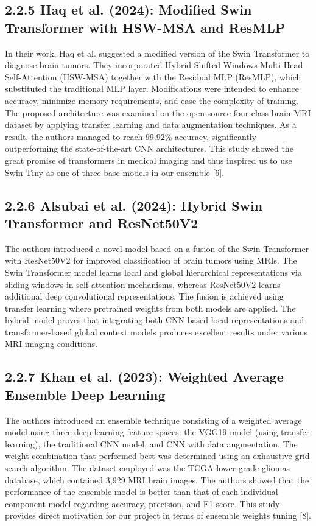 \documentclass[12pt,a4paper,oneside]{report}
\begin{document}
\subsection*{2.2.5 Haq et al. (2024): Modified Swin Transformer with HSW-MSA and ResMLP}
In their work, Haq et al. suggested a modified version of the Swin Transformer to diagnose brain tumors. They incorporated Hybrid Shifted Windows Multi-Head Self-Attention (HSW-MSA) together with the Residual MLP (ResMLP), which substituted the traditional MLP layer. Modifications were intended to enhance accuracy, minimize memory requirements, and ease the complexity of training. The proposed architecture was examined on the open-source four-class brain MRI dataset by applying transfer learning and data augmentation techniques. As a result, the authors managed to reach 99.92\% accuracy, significantly outperforming the state-of-the-art CNN architectures. This study showed the great promise of transformers in medical imaging and thus inspired us to use Swin-Tiny as one of three base models in our ensemble [6].
\subsection*{2.2.6 Alsubai et al. (2024): Hybrid Swin Transformer and ResNet50V2}
The authors introduced a novel model based on a fusion of the Swin Transformer with ResNet50V2 for improved classification of brain tumors using MRIs. The Swin Transformer model learns local and global hierarchical representations via sliding windows in self-attention mechanisms, whereas ResNet50V2 learns additional deep convolutional representations. The fusion is achieved using transfer learning where pretrained weights from both models are applied. The hybrid model proves that integrating both CNN-based local representations and transformer-based global context models produces excellent results under various MRI imaging conditions.
\subsection*{2.2.7 Khan et al. (2023): Weighted Average Ensemble Deep Learning}
The authors introduced an ensemble technique consisting of a weighted average model using three deep learning feature spaces: the VGG19 model (using transfer learning), the traditional CNN model, and CNN with data augmentation. The weight combination that performed best was determined using an exhaustive grid search algorithm. The dataset employed was the TCGA lower-grade gliomas database, which contained 3,929 MRI brain images. The authors showed that the performance of the ensemble model is better than that of each individual component model regarding accuracy, precision, and F1-score. This study provides direct motivation for our project in terms of ensemble weights tuning [8].
\end{document}
